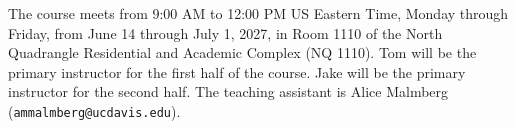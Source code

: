 The course meets from 9:00 AM to 12:00 PM US Eastern Time, Monday
through Friday, from June 14 through July 1, 2027, in Room 1110 of the North
Quadrangle Residential and Academic Complex (NQ 1110). Tom will be the primary
instructor for the first half of the course. Jake will be the primary instructor
for the second half. The teaching assistant is Alice Malmberg
(\texttt{ammalmberg@ucdavis.edu}).
